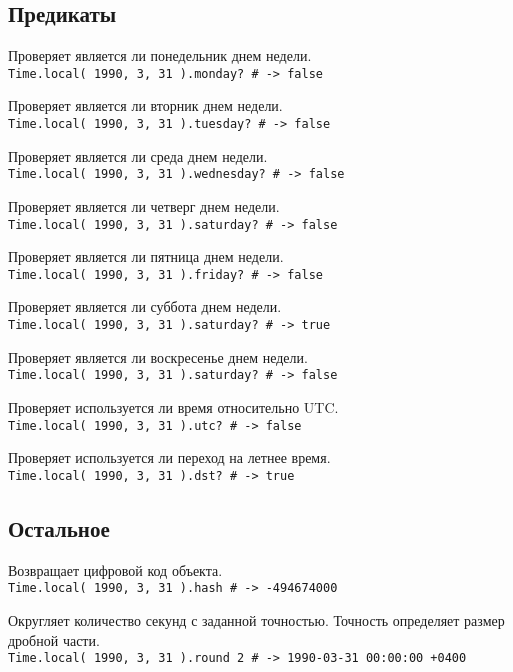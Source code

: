 \subsection*{Предикаты}

\begin{methodlist}
  Проверяет является ли понедельник днем недели. 
  \\\verb!Time.local( 1990, 3, 31 ).monday? # -> false!

  Проверяет является ли вторник днем недели. 
  \\\verb!Time.local( 1990, 3, 31 ).tuesday? # -> false!
 
  Проверяет является ли среда днем недели. 
  \\\verb!Time.local( 1990, 3, 31 ).wednesday? # -> false!
 
  Проверяет является ли четверг днем недели. 
  \\\verb!Time.local( 1990, 3, 31 ).saturday? # -> false!
 
  Проверяет является ли пятница днем недели. 
  \\\verb!Time.local( 1990, 3, 31 ).friday? # -> false!
 
  Проверяет является ли суббота днем недели. 
  \\\verb!Time.local( 1990, 3, 31 ).saturday? # -> true!
 
  Проверяет является ли воскресенье днем недели. 
  \\\verb!Time.local( 1990, 3, 31 ).saturday? # -> false!

  Проверяет используется ли время относительно UTC. 
  \\\verb!Time.local( 1990, 3, 31 ).utc? # -> false!
 
  Проверяет используется ли переход на летнее время. 
  \\\verb!Time.local( 1990, 3, 31 ).dst? # -> true!
\end{methodlist}
 
\subsection*{Остальное}

\begin{methodlist}
  Возвращает цифровой код объекта. 
  \\\verb!Time.local( 1990, 3, 31 ).hash # -> -494674000!

  Округляет количество секунд с заданной точностью. Точность определяет размер дробной части. 
  \\\verb!Time.local( 1990, 3, 31 ).round 2 # -> 1990-03-31 00:00:00 +0400!
\end{methodlist}